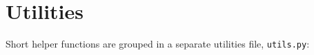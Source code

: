 \section{Utilities}
Short helper functions are grouped in a separate utilities file, \texttt{utils.py}:

% 